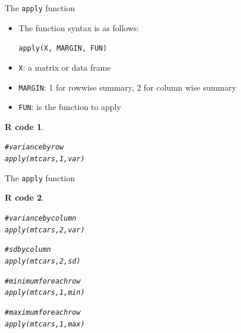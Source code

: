\documentclass[11pt]{beamer}\usepackage[]{graphicx}\usepackage[]{color}
\makeatletter
\newcommand{\hlnum}[1]{\textcolor[rgb]{0.063,0.58,0.627}{#1}}%
\newcommand{\hlcom}[1]{\textcolor[rgb]{0.588,0.588,0.588}{#1}}%
\newcommand{\hlstd}[1]{\textcolor[rgb]{0.196,0.196,0.196}{#1}}%
\newcommand{\hlkwd}[1]{\textcolor[rgb]{0.78,0.227,0.412}{#1}}%
\newenvironment{kframe}{%
 \def\at@end@of@kframe{}%
 \ifinner\ifhmode%
  \def\at@end@of@kframe{\end{minipage}}%
  \begin{minipage}{\columnwidth}%
 \fi\fi%
 \def\FrameCommand##1{\hskip\@totalleftmargin \hskip-\fboxsep
 \colorbox{shadecolor}{##1}\hskip-\fboxsep
     \hskip-\linewidth \hskip-\@totalleftmargin \hskip\columnwidth}%
 \MakeFramed {\advance\hsize-\width
   \@totalleftmargin\z@ \linewidth\hsize
   \@setminipage}}%
 {\par\unskip\endMakeFramed%
 \at@end@of@kframe}
\newenvironment{knitrout}{}{} %
\newtheorem{rcode}{R code}[section]
\newcommand{\code}[1]{\texttt{#1}}
\makeatother
\begin{document}
\begin{frame}[fragile]{The \code{apply} function}
\begin{itemize}
  \setlength\itemsep{1em}
\item The function syntax is as follows:
\begin{center}
\code{apply(X, MARGIN, FUN)}
\end{center}
\item \code{X}: a matrix or data frame
\item \code{MARGIN}: 1 for rowwise summary, 2 for column wise summary
\item \code{FUN}: is the function to apply
\end{itemize}
\pause 
\begin{knitrout}
\color{fgcolor}\begin{kframe}
\begin{rcode}\label{unnamed-chunk-37}\begin{alltt}
\hlcom{# variance by row}
\hlkwd{apply}\hlstd{(mtcars,} \hlnum{1}\hlstd{, var)}
\end{alltt}
\end{rcode}\end{kframe}
\end{knitrout}


\end{frame}









\begin{frame}[fragile]{The \code{apply} function}
\begin{knitrout}
\color{fgcolor}\begin{kframe}
\begin{rcode}\label{unnamed-chunk-38}\begin{alltt}
\hlcom{# variance by column}
\hlkwd{apply}\hlstd{(mtcars,} \hlnum{2}\hlstd{, var)}

\hlcom{# sd by column}
\hlkwd{apply}\hlstd{(mtcars,} \hlnum{2}\hlstd{, sd)}

\hlcom{# minimum for each row}
\hlkwd{apply}\hlstd{(mtcars,} \hlnum{1}\hlstd{, min)}


\hlcom{# maximum for each row}
\hlkwd{apply}\hlstd{(mtcars,} \hlnum{1}\hlstd{, max)}
\end{alltt}
\end{rcode}\end{kframe}
\end{knitrout}


\end{frame}
\end{document}
